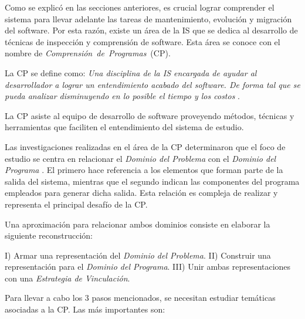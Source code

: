 Como se explicó en las secciones anteriores, es crucial lograr comprender el sistema para llevar adelante las tareas de mantenimiento, evolución y migración del software.	
Por esta razón, existe un área de la IS que se dedica al desarrollo de técnicas de inspección y comprensión de software. Esta área se conoce con el nombre de \mbox{\textit{Comprensión de Programas} (CP).}

La CP se define como: \textit{Una disciplina de la IS encargada de ayudar al desarrollador a lograr un entendimiento acabado del software. De forma tal que se pueda analizar disminuyendo en lo posible el tiempo y los costos} \cite{MPMR07}.  

La CP asiste al equipo de desarrollo de software proveyendo métodos, técnicas y herramientas que faciliten el entendimiento del sistema de estudio.

Las investigaciones realizadas en el área de la CP determinaron que el foco de estudio se centra en relacionar el \textit{Dominio del Problema} con el \textit{Dominio del Programa} \cite{BRM10,MPMR07,MBPHRU10,DWE04}. El primero hace referencia a los elementos que forman parte de la salida del sistema, mientras que el segundo indican las componentes del programa empleados para generar dicha salida.
Esta relación es compleja de realizar y representa el principal desafío de la CP. 

Una aproximación para relacionar ambos dominios consiste en elaborar la siguiente reconstrucción:

I) Armar una representación del \textit{Dominio del Problema}. II) Construir una representación para el \textit{Dominio del Programa}. III) Unir ambas representaciones con una \textit{Estrategia de Vinculación}.

Para llevar a cabo los 3 pasos mencionados, se necesitan estudiar temáticas asociadas a la CP. Las más importantes son:

